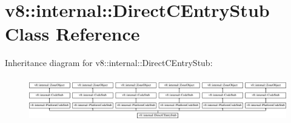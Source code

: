 \hypertarget{classv8_1_1internal_1_1DirectCEntryStub}{}\section{v8\+:\+:internal\+:\+:Direct\+C\+Entry\+Stub Class Reference}
\label{classv8_1_1internal_1_1DirectCEntryStub}
Inheritance diagram for v8\+:\+:internal\+:\+:Direct\+C\+Entry\+Stub\+:\begin{figure}[H]
\begin{center}
\leavevmode
\includegraphics[height=1.975309cm]{classv8_1_1internal_1_1DirectCEntryStub}
\end{center}
\end{figure}
